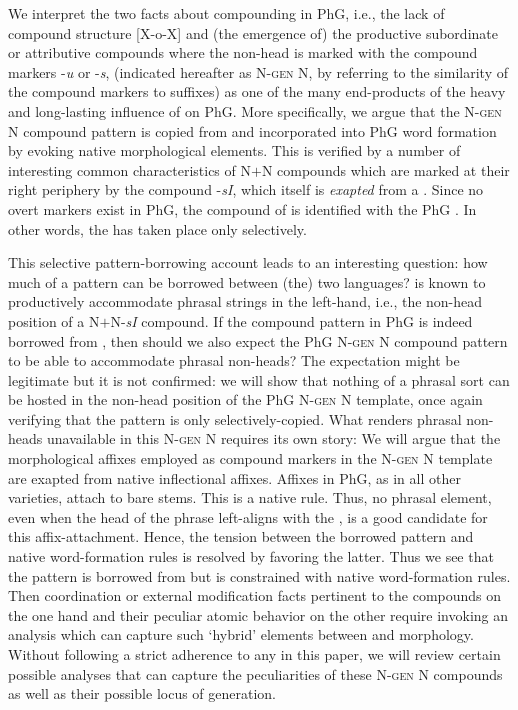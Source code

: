 \documentclass[output=paper]{LSP/langsci}
\begin{document}
We interpret the two facts about compounding in PhG, i.e., the lack of  compound structure [X-o-X] and (the emergence of) the productive subordinate or attributive compounds where the non-head is marked with the compound markers -\textit{u} or -\textit{s}, (indicated hereafter as N-\textsc{gen} N, by referring to the similarity of the compound markers to  suffixes) as one of the many end-products of the heavy and long-lasting influence of  on PhG. More specifically, we argue that the N-\textsc{gen} N compound pattern is copied from  and incorporated into PhG word formation by evoking native morphological elements. This is verified by a number of interesting common characteristics of  N$+$N compounds which are marked at their right periphery by the compound  -\textit{sI}, which itself is \textit{exapted} from a  . Since no overt  markers exist in PhG, the compound  of  is identified with the PhG  . In other words, the  has taken place only selectively.

This selective pattern-borrowing account leads to an interesting question: how much of a pattern can be borrowed between (the) two languages?  is known to productively accommodate phrasal strings in the left-hand, i.e., the non-head position of a N$+$N-\textit{sI} compound. If the compound pattern in PhG is indeed borrowed from , then should we also expect the PhG N-\textsc{gen} N compound pattern to be able to accommodate phrasal non-heads? The expectation might be legitimate but it is not confirmed: we will show that nothing of a phrasal sort can be hosted in the non-head position of the PhG N-\textsc{gen} N template, once again verifying that the pattern is only selectively-copied. What renders phrasal non-heads unavailable in this N-\textsc{gen} N requires its own story: We will argue that the morphological affixes employed  as compound markers in the N-\textsc{gen} N template are exapted from native inflectional affixes. Affixes in PhG, as in all other  varieties, attach to bare stems. This is a native rule. Thus, no phrasal element, even when the head of the phrase left-aligns with the , is a good candidate for this affix-attachment. Hence, the tension between the borrowed pattern and native word-formation rules is resolved by favoring the latter. Thus we see that the pattern is borrowed from  but is constrained with native word-formation rules. Then coordination or external modification facts pertinent to the compounds on the one hand and their peculiar atomic behavior on the other require invoking an analysis which can capture such `hybrid' elements between  and morphology. Without following a strict adherence to any in this paper, we will review certain possible analyses that can capture the peculiarities of these N-\textsc{gen} N compounds as well as their possible locus of generation.
\end{document}
